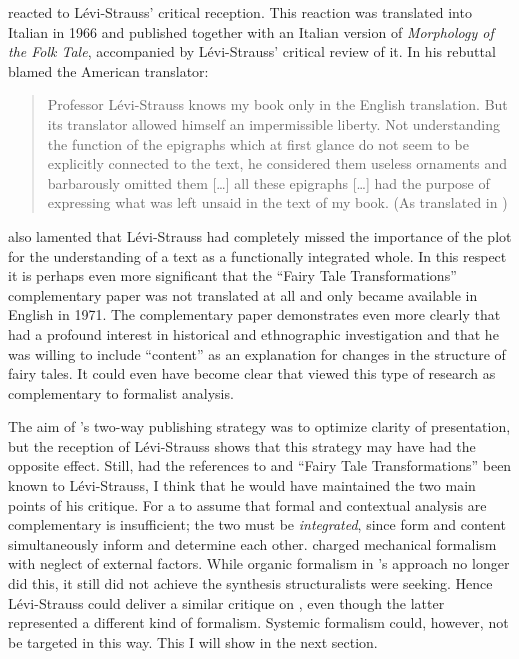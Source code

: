 \documentclass[output=paper]{langscibook}
\begin{document}
{\Propp} reacted to Lévi-Strauss' critical reception. This reaction was translated into Italian in 1966 and published together with an Italian version of \emph{Morphology of the Folk Tale}, accompanied by Lévi-Strauss' critical review of it. In his rebuttal {\Propp} blamed the American translator:

\begin{quotation}
Professor Lévi-Strauss knows my book only in the English translation. But its translator allowed himself an impermissible liberty. Not understanding the function of the epigraphs which at first glance do not seem to be explicitly connected to the text, he considered them useless ornaments and barbarously omitted them […] all these epigraphs […] had the purpose of expressing what was left unsaid in the text of my book. (As translated in \citealt[81]{Steiner1984})
\end{quotation}

{\Propp} also lamented that Lévi-Strauss had completely missed the importance of the plot for the understanding of a text as a functionally integrated whole. In this respect it is perhaps even more significant that the ``Fairy Tale Transformations'' complementary paper was not translated at all and only became available in English in 1971. The complementary paper demonstrates even more clearly that {\Propp} had a profound interest in historical and ethnographic investigation and that he was willing to include ``content'' as an explanation for changes in the structure of fairy tales. It could even have become clear that {\Propp} viewed this type of research as complementary to formalist analysis.

The aim of {\Propp}'s two-way publishing strategy was to optimize clarity of presentation, but the reception of Lévi-Strauss shows that this strategy may have had the opposite effect. Still, had the references to {\Goethe} and ``Fairy Tale Transformations'' been known to Lévi-Strauss, I think that he would have maintained the two main points of his critique. For a  to assume that formal and contextual analysis are complementary is insufficient; the two must be \emph{integrated}, since form and content simultaneously inform and determine each other. {\Mukarovsky} charged mechanical formalism with neglect of external factors. While organic formalism in {\Propp}'s approach no longer did this, it still did not achieve the synthesis structuralists were seeking. Hence Lévi-Strauss could deliver a similar critique on {\Propp}, even though the latter represented a different kind of formalism. Systemic formalism could, however, not be targeted in this way. This I will show in the next section.
\end{document}
